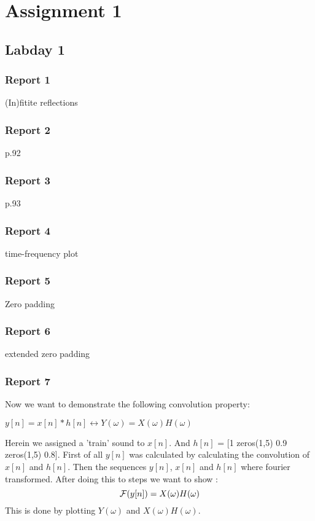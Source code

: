 \documentclass[11pt,titlepage]{report}
\begin{document}
\chapter{Assignment 1}
\section{Labday 1}
\subsection{Report 1}
(In)fitite reflections

\subsection{Report 2}
p.92
\subsection{Report 3}
p.93
\subsection{Report 4}
time-frequency plot
\subsection{Report 5}
Zero padding
\subsection{Report 6}
extended zero padding

\subsection{Report 7}
Now we want to demonstrate the following convolution property: \newline
\begin{center}
 $y[n] = x[n]*h[n] \leftrightarrow Y(\omega) = X(\omega)H(\omega)$ 
\end{center}
Herein we assigned a 'train' sound to  $x[n]$.  And  $h[n]$ = [1  zeros(1,5)  0.9 zeros(1,5)  0.8].
First of all $y[n]$ was calculated by calculating the convolution of $x[n]$ and $h[n]$. Then the sequences $y[n]$, $x[n]$ and $h[n]$ where fourier transformed. After doing this to steps we want to show :
\begin{equation}
\centering
 \mathcal{F}(y[n]) = X(\omega)H(\omega)
\end{equation}
This is done by plotting $Y(\omega)$ and $X(\omega)H(\omega)$. 
\end{document}
